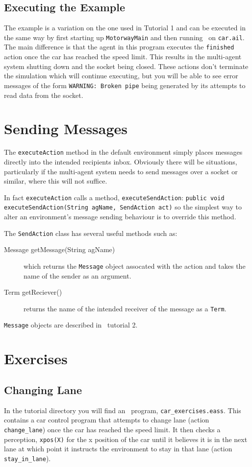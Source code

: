 \documentclass[a4]{article}
\begin{document}
\subsection{Executing the Example}
The example is a variation on the one used in Tutorial 1 and can be executed in the same way by first starting up \texttt{MotorwayMain} and then running \ail\ on \texttt{car.ail}.  The main difference is that the agent in this program executes the \lstinline{finished} action once the car has reached the speed limit.  This results in the multi-agent system shutting down and the socket being closed.  These actions don't terminate the simulation which will continue executing, but you will be able to see error messages of the form \texttt{WARNING: Broken pipe} being generated by its attempts to read data from the socket.

\section{Sending Messages}
The \texttt{executeAction} method in the default environment simply places messages directly into the intended recipients inbox.  Obviously there will be situations, particularly if the multi-agent system needs to send messages over a socket or similar, where this will not suffice.

In fact \texttt{executeAction} calls a method, \texttt{executeSendAction}: \texttt{public void executeSendAction(String agName, SendAction act)} so the simplest way to alter an environment's message sending behaviour is to override this method.

The \texttt{SendAction} class has several useful methods such as:
\begin{description}
\item[Message getMessage(String agName)] which returns the \texttt{Message} object assocated with the action and takes the name of the sender as an argument.
\item[Term getReciever()] returns the name of the intended receiver of the message as a \texttt{Term}.
\end{description}
\texttt{Message} objects are described in \ail\ tutorial 2.

\section{Exercises}
\subsection{Changing Lane}
In the tutorial directory you will find an \eass\ program, \texttt{car\_exercises.eass}.  This contains a car control program that attempts to change lane (action \lstinline{change_lane}) once the car has reached the speed limit.  It then checks a perception, \lstinline{xpos(X)} for the x position of the car until it believes it is in the next lane at which point it instructs the environment to stay in that lane (action \lstinline{stay_in_lane}). 
\end{document}
